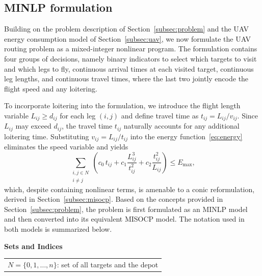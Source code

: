 \documentclass[11pt]{article}
\let\originalsubsection\subsection
\renewcommand{\subsection}{\FloatBarrier\originalsubsection}
\begin{document}
\subsection{MINLP formulation}\label{subsec:minlp}
Building on the problem description of Section~\ref{subsec:problem} and the UAV energy consumption model of Section~\ref{subsec:uav}, we now formulate the UAV routing problem as a mixed-integer nonlinear program. The formulation contains four groups of decisions, namely binary indicators to select which targets to visit and which legs to fly, continuous arrival times at each visited target, continuous leg lengths, and continuous travel times, where the last two jointly encode the flight speed and any loitering.

To incorporate loitering into the formulation, we introduce the flight length variable $L_{ij} \ge d_{ij}$ for each leg $(i,j)$ and define travel time as
$
t_{ij} = L_{ij}/v_{ij}.
$
Since $L_{ij}$ may exceed $d_{ij}$, the travel time $t_{ij}$ naturally accounts for any additional loitering time. Substituting $v_{ij} = L_{ij}/t_{ij}$ into the energy function~\eqref{eq:energy} eliminates the speed variable and yields
\[
\sum_{\substack{i,j \in N \\ i \neq j}} \left( c_0\, t_{ij} + c_1 \frac{L_{ij}^3}{t_{ij}^2} + c_2 \frac{t_{ij}^2}{L_{ij}} \right) \le E_{\max},
\]
which, despite containing nonlinear terms, is amenable to a conic reformulation, derived in Section~\ref{subsec:misocp}. Based on the concepts provided in Section~\ref{subsec:problem}, the problem is first formulated as an MINLP model and then converted into its equivalent MISOCP model. The notation used in both models is summarized below.

\vspace{4mm}
\noindent\textbf{Sets and Indices}

\vspace{2mm}
\begin{tabular}{@{}l}
$N = \{0,1,\ldots,n\}$: set of all targets and the depot \\[6pt]

\end{tabular}
\end{document}
